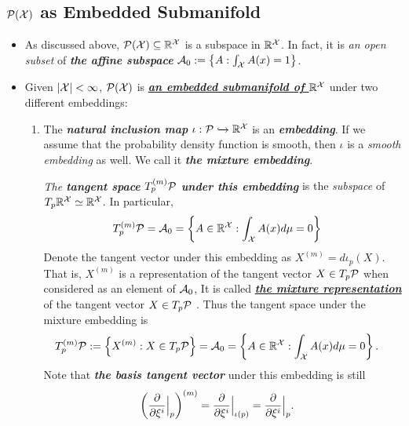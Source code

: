 \documentclass[11pt]{article}
\begin{document}
\subsection{${\mathcal P}({\mathcal X})$ as Embedded Submanifold}
\begin{itemize}
\item As discussed above, ${\mathcal P}({\mathcal X}) \subseteq {\mathbb R}^{{\mathcal X}}$ is a subspace in ${\mathbb R}^{{\mathcal X}}$. In fact, it is \emph{an open subset} of \emph{\textbf{the affine subspace}} ${\mathcal A}_0 := \left\{A: \int_{{\mathcal X}} A(x) = 1\right\}$. 

\item Given $|{\mathcal X}| < \infty$, ${\mathcal P}({\mathcal X})$ is \underline{\emph{\textbf{an embedded submanifold of ${\mathbb R}^{{\mathcal X}}$}}} under two different embeddings: 
\begin{enumerate}
\item The \emph{\textbf{natural inclusion map}} $\iota: {\mathcal P} \xhookrightarrow{} {\mathbb R}^{{\mathcal X}}$  is an \emph{\textbf{embedding}}. If we assume that the probability density function is smooth, then $\iota$ is a \emph{smooth embedding} as well.  We call it \emph{\textbf{the mixture embedding}}.

\emph{The \textbf{tangent space} $T_{p}^{(m)}{\mathcal P}$ \textbf{under this embedding}} is the \emph{subspace} of $T_{p}{\mathbb R}^{{\mathcal X}} \simeq {\mathbb R}^{{\mathcal X}}$. In particular, 
\begin{align*}
T_{p}^{(m)}{\mathcal P} &= {\mathcal A}_0 = \left\{A \in {\mathbb R}^{{\mathcal X}}: \int_{{\mathcal X}}A(x) d\mu = 0\right\}
\end{align*} Denote the tangent vector under this embedding as $X^{(m)} = d\iota_{p}(X)$. That is, $X^{(m)}$ is a representation of the tangent vector $X \in T_p{\mathcal P}$ when considered as an element of ${\mathcal A}_{0}$,  It is called \underline{\emph{\textbf{the mixture representation}}} of the tangent vector $X \in T_p{\mathcal P}$ \citep{amari2007methods}.
Thus the tangent space under the mixture embedding is 
\begin{align}
T_{p}^{(m)}{\mathcal P} &:= \left\{X^{(m)}: X \in T_p{\mathcal P}\right\} = {\mathcal A}_0 = \left\{A \in {\mathbb R}^{{\mathcal X}}: \int_{{\mathcal X}}A(x) d\mu = 0\right\}. \label{eqn:tangent_space_mix}
\end{align}
Note that \emph{\textbf{the basis tangent vector}} under this embedding is still
\begin{align}
\left(\frac{\partial }{ \partial \xi^i}\Bigr|_{p}\right)^{(m)} &= \frac{\partial }{ \partial \xi^i}\Bigr|_{\iota(p)} = \frac{\partial }{ \partial \xi^i}\Bigr|_{p}. \label{eqn: basis_tangent_vec_mix}
\end{align}



\end{enumerate}
\end{itemize}
\end{document}
